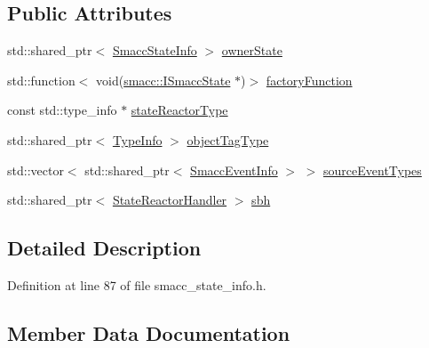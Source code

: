 \subsection*{Public Attributes}
\begin{DoxyCompactItemize}
\item 
std\+::shared\+\_\+ptr$<$ \hyperlink{classsmacc_1_1introspection_1_1SmaccStateInfo}{Smacc\+State\+Info} $>$ \hyperlink{structsmacc_1_1introspection_1_1SmaccStateReactorInfo_a7f79a42095ce284939ca47fb25a14101}{owner\+State}
\item 
std\+::function$<$ void(\hyperlink{classsmacc_1_1ISmaccState}{smacc\+::\+I\+Smacc\+State} $\ast$)$>$ \hyperlink{structsmacc_1_1introspection_1_1SmaccStateReactorInfo_a07d93f820f191aa3f9811fc2e1792b7a}{factory\+Function}
\item 
const std\+::type\+\_\+info $\ast$ \hyperlink{structsmacc_1_1introspection_1_1SmaccStateReactorInfo_a02de210fcdffd81424537d4d8a330609}{state\+Reactor\+Type}
\item 
std\+::shared\+\_\+ptr$<$ \hyperlink{classsmacc_1_1introspection_1_1TypeInfo}{Type\+Info} $>$ \hyperlink{structsmacc_1_1introspection_1_1SmaccStateReactorInfo_ae76d3acd0f68e75051ed002f10539738}{object\+Tag\+Type}
\item 
std\+::vector$<$ std\+::shared\+\_\+ptr$<$ \hyperlink{structsmacc_1_1introspection_1_1SmaccEventInfo}{Smacc\+Event\+Info} $>$ $>$ \hyperlink{structsmacc_1_1introspection_1_1SmaccStateReactorInfo_a66cb20b15e0ad0fbfd5ad20b83462eb6}{source\+Event\+Types}
\item 
std\+::shared\+\_\+ptr$<$ \hyperlink{classsmacc_1_1introspection_1_1StateReactorHandler}{State\+Reactor\+Handler} $>$ \hyperlink{structsmacc_1_1introspection_1_1SmaccStateReactorInfo_a6a112865af683d44f4eb824f54656a26}{sbh}
\end{DoxyCompactItemize}


\subsection{Detailed Description}


Definition at line 87 of file smacc\+\_\+state\+\_\+info.\+h.



\subsection{Member Data Documentation}
\mbox{\label{structsmacc_1_1introspection_1_1SmaccStateReactorInfo_a07d93f820f191aa3f9811fc2e1792b7a}} 
